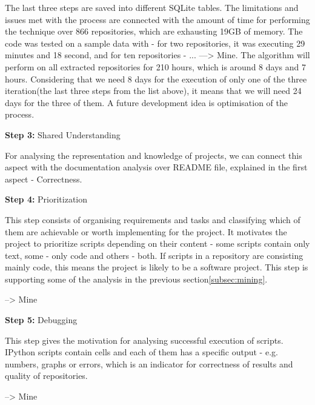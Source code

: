 The last three steps are saved into different SQLite\cite{sqlite3} tables. The limitations and issues met with the process are connected with the amount of time for performing the technique over 866 repositories, which are exhausting 19GB of memory. The code was tested on a sample data with - for two repositories, it was executing 29 minutes and 18 second, and for ten repositories - ... ---> Mine. The algorithm will perform on all extracted repositories for 210 hours, which is around 8 days and 7 hours. Considering that we need 8 days for the execution of only one of the three iteration(the last three steps from the list above), it means that we will need 24 days for the three of them. A future development idea is optimisation of the process. 


\vspace{5mm}
\begin{mdframed}
\vspace{1px}
\textbf{Step 3:} Shared Understanding
\vspace{1px}
\end{mdframed}
\vspace{2mm}

For analysing the representation and knowledge of projects, we can connect this aspect with the documentation analysis over README file, explained in the first aspect - Correctness.


\vspace{5mm}
\begin{mdframed}
\vspace{1px}
\textbf{Step 4:} Prioritization
\vspace{1px}
\end{mdframed}
\vspace{2mm}

This step consists of organising requirements and tasks and classifying which of them are achievable or worth
implementing for the project. It motivates the project to prioritize scripts depending on their content - some scripts contain only text, some - only code and others - both. If scripts in a repository are consisting mainly code, this means the project is likely to be a software project. This step is supporting some of the analysis in the previous section\ref{subsec:mining}.

--> Mine

\vspace{5mm}
\begin{mdframed}
\vspace{1px}
\textbf{Step 5:} Debugging
\vspace{1px}
\end{mdframed}

This step gives the motivation for analysing successful execution of scripts. IPython scripts contain cells and each of them has a specific output - e.g. numbers, graphs or errors, which is an indicator for correctness of results and quality of repositories. 

--> Mine

\vspace{10mm}
